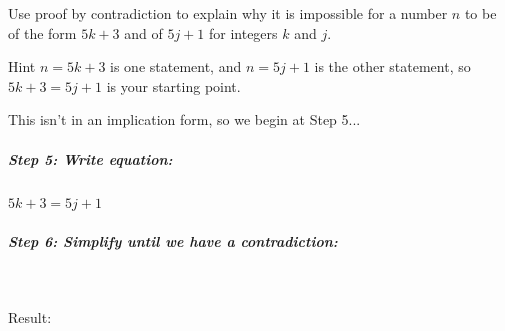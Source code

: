         \newpage

        \begin{questionNOGRADE}{\thequestion}

            Use proof by contradiction to explain why it is impossible
            for a number $n$ to be of the form $5k+3$ and of $5j+1$ for
            integers $k$ and $j$.

            \begin{hint}{Hint}
                $n = 5k+3$ is one statement, and $n = 5j+1$ is the other statement,
                so $5k+3 = 5j+1$ is your starting point.
            \end{hint}

            This isn't in an implication form, so we begin at Step 5...
                
            \subparagraph{Step 5: Write equation:} $5k+3 = 5j+1$

            \subparagraph{Step 6: Simplify until we have a contradiction:} ~\\

            Result:
            
        \end{questionNOGRADE}


